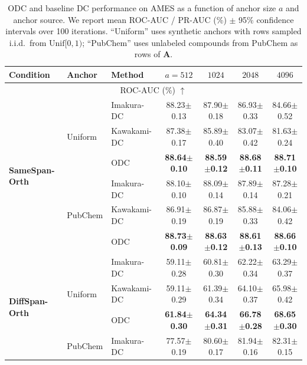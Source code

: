 \documentclass[final,3p,times]{elsarticle}
\theoremstyle{plain}
\newcommand{\matr}[1]{\bm{#1}}        %
\begin{document}
\begin{table}[t]
  \centering
  \caption{ODC and baseline DC performance on AMES as a function of anchor size $a$ and anchor source.
  We report mean ROC-AUC / PR-AUC (\%) $\pm $ 95\% confidence intervals over 100 iterations.
  ``Uniform'' uses synthetic anchors with rows sampled i.i.d.\ from $\mathrm{Unif}[0,1)$; ``PubChem''
  uses unlabeled compounds from PubChem as rows of $\matr{A}$.}
  \label{tab:anchor-ames}
  \begin{tabular}{lllcccc}
    \toprule
    Condition & Anchor & Method & $a=512$ & $1024$ & $2048$ & $4096$ \\
    \midrule
    \multicolumn{7}{c}{ROC-AUC (\%) $\uparrow$} \\
    \midrule
    \multirow{6}{*}{\textbf{SameSpan-Orth}}
      & \multirow{3}{*}{Uniform}
        & Imakura-DC~\cite{DCframework1}   & 88.23$\pm$0.13 & 87.90$\pm$0.18 & 86.93$\pm$0.33 & 84.66$\pm$0.52 \\
      &  & Kawakami-DC~\cite{KawakamiDC} & 87.38$\pm$0.17 & 85.89$\pm$0.40 & 83.07$\pm$0.42 & 81.63$\pm$0.24 \\
      &  & ODC   & \textbf{88.64$\pm$0.10} & \textbf{88.59$\pm$0.12} & \textbf{88.68$\pm$0.11} & \textbf{88.71$\pm$0.10} \\
    \cmidrule(lr){2-7}
      & \multirow{3}{*}{PubChem}
        & Imakura-DC~\cite{DCframework1}   & 88.10$\pm$0.10 & 88.09$\pm$0.14 & 87.89$\pm$0.14 & 87.28$\pm$0.21 \\
      &  & Kawakami-DC~\cite{KawakamiDC} & 86.91$\pm$0.19 & 86.87$\pm$0.19 & 85.88$\pm$0.33 & 84.06$\pm$0.42 \\
      &  & ODC   & \textbf{88.73$\pm$0.09} & \textbf{88.63$\pm$0.12} & \textbf{88.61$\pm$0.13} & \textbf{88.66$\pm$0.10} \\
    \midrule
    \multirow{6}{*}{\textbf{DiffSpan-Orth}}
      & \multirow{3}{*}{Uniform}
        & Imakura-DC~\cite{DCframework1}   & 59.11$\pm$0.28 & 60.81$\pm$0.30 & 62.22$\pm$0.34 & 63.29$\pm$0.37 \\
      &  & Kawakami-DC~\cite{KawakamiDC} & 59.11$\pm$0.29 & 61.39$\pm$0.34 & 64.10$\pm$0.37 & 65.98$\pm$0.42 \\
      &  & ODC   & \textbf{61.84$\pm$0.30} & \textbf{64.34$\pm$0.31} & \textbf{66.78$\pm$0.28} & \textbf{68.65$\pm$0.30} \\
    \cmidrule(lr){2-7}
      & \multirow{3}{*}{PubChem}
        & Imakura-DC~\cite{DCframework1}   & 77.57$\pm$0.19 & 80.60$\pm$0.17 & 81.94$\pm$0.16 & 82.31$\pm$0.15 \\

\end{tabular}
\end{table}
\end{document}
